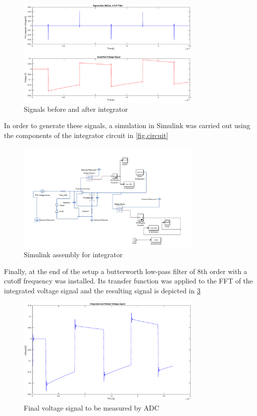 \begin{figure}[h!tb]
\centerline{\includegraphics[width=0.8\textwidth]{figures/Method/signal_simulation/integrated.eps}}
\caption{Signals before and after integrator}
\label{fig.integrator}
\end{figure}

In order to generate these signals, a simulation in Simulink was carried out using the components of the integrator circuit in \ref{fig.circuit}

\begin{figure}[h!tb]
\centerline{\includegraphics[width=0.8\textwidth]{figures/Method/signal_simulation/simulink.eps}}
\caption{Simulink assembly for integrator}
\label{fig.simulink}
\end{figure}

Finally, at the end of the setup a butterworth low-pass filter of 8th order with a cutoff frequency
was installed. Its transfer function was applied to the FFT of the integrated voltage signal and the resulting 
signal is depicted in \ref{fig.finalvolt}


\begin{figure}[h!tb]
\centerline{\includegraphics[width=0.8\textwidth]{figures/Method/signal_simulation/finalvolt.eps}}
\caption{Final voltage signal to be measured by ADC}
\label{fig.finalvolt}
\end{figure}


